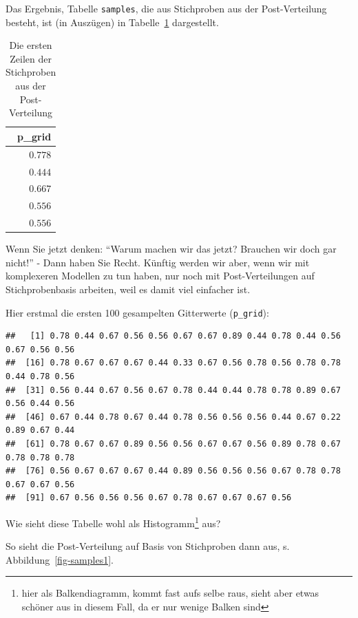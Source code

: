 \documentclass[
  a4paper,
  DIV=11]{scrreprt}
\theoremstyle{definition}
\theoremstyle{remark}
\begin{document}
Das Ergebnis, Tabelle \texttt{samples}, die aus Stichproben aus der
Post-Verteilung besteht, ist (in Auszügen) in
Tabelle~\ref{tbl-postsample1} dargestellt.

\hypertarget{tbl-postsample1}{}
\begin{longtable}{r}
\caption{\label{tbl-postsample1}Die ersten Zeilen der Stichproben aus der Post-Verteilung }\tabularnewline

\toprule
p\_grid \\ 
\midrule
$0.778$ \\ 
$0.444$ \\ 
$0.667$ \\ 
$0.556$ \\ 
$0.556$ \\ 
\bottomrule
\end{longtable}

Wenn Sie jetzt denken: ``Warum machen wir das jetzt? Brauchen wir doch
gar nicht!'' - Dann haben Sie Recht. Künftig werden wir aber, wenn wir
mit komplexeren Modellen zu tun haben, nur noch mit Post-Verteilungen
auf Stichprobenbasis arbeiten, weil es damit viel einfacher ist.

Hier erstmal die ersten 100 gesampelten Gitterwerte (\texttt{p\_grid}):

\begin{verbatim}
##   [1] 0.78 0.44 0.67 0.56 0.56 0.67 0.67 0.89 0.44 0.78 0.44 0.56 0.67 0.56 0.56
##  [16] 0.78 0.67 0.67 0.67 0.44 0.33 0.67 0.56 0.78 0.56 0.78 0.78 0.44 0.78 0.56
##  [31] 0.56 0.44 0.67 0.56 0.67 0.78 0.44 0.44 0.78 0.78 0.89 0.67 0.56 0.44 0.56
##  [46] 0.67 0.44 0.78 0.67 0.44 0.78 0.56 0.56 0.56 0.44 0.67 0.22 0.89 0.67 0.44
##  [61] 0.78 0.67 0.67 0.89 0.56 0.56 0.67 0.67 0.56 0.89 0.78 0.67 0.78 0.78 0.78
##  [76] 0.56 0.67 0.67 0.67 0.44 0.89 0.56 0.56 0.56 0.67 0.78 0.78 0.67 0.67 0.56
##  [91] 0.67 0.56 0.56 0.56 0.67 0.78 0.67 0.67 0.67 0.56
\end{verbatim}

Wie sieht diese Tabelle wohl als Histogramm\footnote{hier als
  Balkendiagramm, kommt fast aufs selbe raus, sieht aber etwas schöner
  aus in diesem Fall, da er nur wenige Balken sind} aus?

So sieht die Post-Verteilung auf Basis von Stichproben dann aus, s.
Abbildung~\ref{fig-samples1}.
\end{document}
